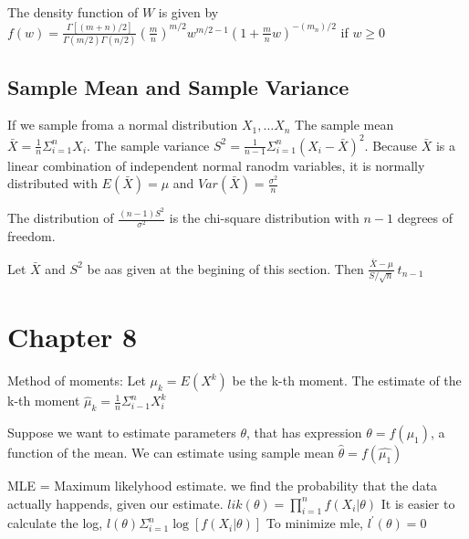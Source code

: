 \documentclass{article}
\begin{document}
\begin{multicols*}{3}
    The density function of $W$ is given by $f\left( w \right) = \frac{\Gamma \left[ \left( m + n\right)/2 \right]}{\Gamma \left( m/2 \right) \Gamma\left( n/2 \right)} \left(\frac{m}{n}\right)^{m/2} w^{m/2 - 1} \left( 1 + \frac{m}{n}w \right)^{-\left(m_n\right)/2}$
    if $w \geq 0$

    \subsection{Sample Mean and Sample Variance}
    If we sample froma a normal distribution $X_1, \dots X_n$
    The sample mean $\bar{X} = \frac{1}{n}\Sigma_{i=1}^nX_i$.
    The sample variance $S^2 = \frac{1}{n-1}\Sigma_{i=1}^n\left(X_i - \bar{X}\right)^2$.
    Because $\bar{X}$ is a linear combination of independent normal ranodm variables, it is normally distributed with
    $E\left(\bar{X}\right) = \mu$ and $Var\left(\bar{X}\right) = \frac{\sigma^2}{n}$

    The distribution of $\frac{\left(n-1\right)S^2}{\sigma^2}$ is the chi-square distribution with $n-1$ degrees of freedom.

    Let $\bar{X}$ and $S^2$ be aas given at the begining of this section. Then $\frac{\bar{X} - \mu}{S / \sqrt{n}} ~t_{n-1}$

    \section{Chapter 8}
    Method of moments:
    Let $\mu_k= E\left( X^k \right)$ be the k-th moment.
    The estimate of the k-th moment $\hat{\mu}_k = \frac{1}{n} \Sigma_{i-1}^nX_i^k$

    Suppose we want to estimate parameters $\theta$, that has expression $\theta = f\left( \mu_1 \right)$,
    a function of the mean.
    We can estimate using sample mean $\hat{\theta} = f\left(\hat{\mu_1}\right)$

    MLE = Maximum likelyhood estimate.
    we find the probability that the data actually happends, given our estimate.
    $lik\left(\theta\right)  = \prod_{i=1}^n f \left( X_i | \theta \right)$
    It is easier to calculate the log, $l\left( \theta \right) \Sigma_{i=1}^n \log \left[ f\left( X_i | \theta \right) \right]$
    To minimize mle, $l^\prime \left(\theta\right) = 0$



\end{multicols*}
\end{document}
